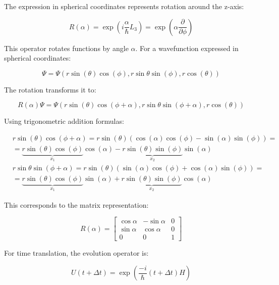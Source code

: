 \documentclass[italian]{HKNdocument}
\begin{document}
The expression in spherical coordinates represents rotation around the z-axis:

\begin{equation}
R(\alpha)=\exp \left(i \frac{\alpha}{\hbar} L_{3}\right)=\exp \left(\alpha \frac{\partial}{\partial \phi}\right)
\end{equation}

This operator rotates functions by angle $\alpha$. For a wavefunction expressed in spherical coordinates:

\begin{equation}
\Psi=\Psi(r \sin (\theta) \cos (\phi), r \sin \theta \sin (\phi), r \cos (\theta))
\end{equation}

The rotation transforms it to:

\begin{equation}
R(\alpha) \Psi=\Psi(r \sin (\theta) \cos (\phi+\alpha), r \sin \theta \sin (\phi+\alpha), r \cos (\theta))
\end{equation}

Using trigonometric addition formulas:

\begin{align}
& r \sin (\theta) \cos (\phi+\alpha)=r \sin (\theta)(\cos (\alpha) \cos (\phi)-\sin (\alpha) \sin (\phi))= \\
& =\underbrace{r \sin (\theta) \cos (\phi)}_{x_{1}} \cos (\alpha)-\underbrace{r \sin (\theta) \sin (\phi)}_{x_{2}} \sin (\alpha)  \\
& r \sin \theta \sin (\phi+\alpha)=r \sin (\theta)(\sin (\alpha) \cos (\phi)+\cos (\alpha) \sin (\phi))= \\
& =\underbrace{r \sin (\theta) \cos (\phi)}_{x_{1}} \sin (\alpha)+\underbrace{r \sin (\theta) \sin (\phi)}_{x_{2}} \cos (\alpha)
\end{align}

This corresponds to the matrix representation:

\[
R(\alpha)=\left[\begin{array}{ccc}
\cos \alpha & -\sin \alpha & 0  \\
\sin \alpha & \cos \alpha & 0 \\
0 & 0 & 1
\end{array}\right]
\]

For time translation, the evolution operator is:

\begin{equation}
U(t+\Delta t)=\exp \left(\frac{-i}{\hbar}(t+\Delta t) H\right)
\end{equation}
\end{document}
